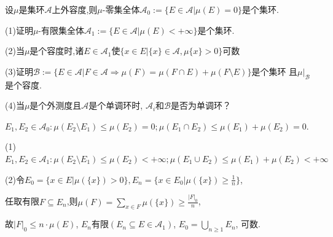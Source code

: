 \begin{7}
设$\mu$是集环$\mathcal{A}$上外容度,则$\mu$-零集全体$\mathcal{A}_0:=\{E\in\mathcal{A}|\mu(E)=0\}$是个集环.

(1)证明$\mu$-有限集全体$\mathcal{A}_1:=\{E\in\mathcal{A}|\mu(E)<+\infty\}$是个集环.

(2)当$\mu$是个容度时,诸$E\in\mathcal{A}_1$使$\{x\in E|\{x\}\in\mathcal{A},\mu\{x\}>0\}$可数

(3)证明$\mathcal{B}:=\{E\in\mathcal{A}|F\in\mathcal{A}\Rightarrow\mu(F)=\mu(F\cap E)+\mu(F\setminus E)\}$是个集环
且$\mu|_{\mathcal{B}}$是个容度.

(4)当$\mu$是个外测度且$\mathcal{A}$是个单调环时, $\mathcal{A}_i$和$\mathcal{B}$是否为单调环？
\end{7}   
\begin{solution}
$E_{1},E_{2}\in \mathcal{A}_0:\mu(E_{2}\setminus E_{1})\leqslant\mu(E_{2})=0;\mu(E_{1}\cap E_{2})\leqslant\mu(E_{1})+\mu(E_{2})=0.$

(1)$E_1,E_2\in \mathcal{A}_1:\mu(E_2\setminus E_1)\leqslant\mu(E_2)<+\infty;\mu(E_1\cup E_2)\leqslant\mu(E_1)+\mu(E_2)<+\infty$

(2)令$E_0=\{x\in E|\mu(\{x\})>0\},E_{n}=\{x\in E_{0}|\mu(\{x\})\geqslant\frac{1}{n}\}$,

任取有限$F\subseteq E_n$,则$\mu(F)=\sum\limits_{x\in F}\mu(\{x\})\geqslant\frac{|F|_{0}}{n}$,

故$|F|_0\leqslant n\cdot\mu(E)$, $E_{n}$有限$(E_n\subseteq E\in\mathcal{A}_1)$, 
$E_{0}=\bigcup\limits_{n\geqslant1} E_{n}$, 可数.
\end{solution}

